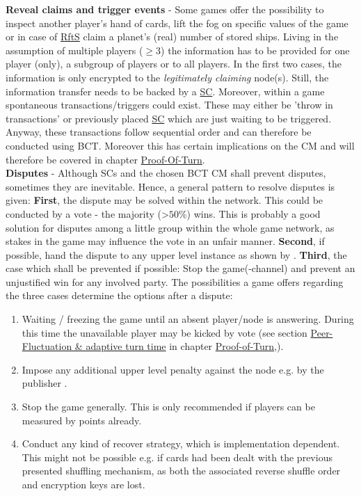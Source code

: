 \textbf{Reveal claims and trigger events} - Some games offer the possibility to inspect another player's hand of cards,
lift the fog on specific values of the game or in case of \hyperref[def:RftS]{RftS} claim a planet's (real) number of stored ships.
Living in the assumption of multiple players ($\geq3$) the information has to be provided for one player (only), a subgroup of players or to all players.
In the first two cases, the information is only encrypted to the \textit{legitimately claiming} node(s).
Still, the information transfer needs to be backed by a \hyperref[sec:SmartContract]{SC}.
Moreover, within a game spontaneous transactions/triggers could exist.
These may either be 'throw in transactions' or previously placed \hyperref[sec:SmartContract]{SC} which are just waiting to be triggered.
Anyway, these transactions follow sequential order and can therefore be conducted using \gls{BCT}.
Moreover this has certain implications on the \gls{CM} and will therefore be covered in chapter \hyperref[chap:PoT]{Proof-Of-Turn}. \\
\textbf{Disputes} - Although \gls{SC}s and the chosen \gls{BCT} \gls{CM} shall prevent disputes, sometimes they are inevitable.
Hence, a general pattern to resolve disputes is given:
\textbf{First}, the dispute may be solved within the network.
This could be conducted by a vote - the majority (>$50$\%) wins.
This is probably a good solution for disputes among a little group within the whole game network, as stakes in the game may influence the vote in an unfair manner.
\textbf{Second}, if possible, hand the dispute to any upper level instance as shown by \citet[92]{Kraft.2016}.
\textbf{Third}, the case which shall be prevented if possible: Stop the game(-channel) and prevent an unjustified win for any involved party.
The possibilities a game offers regarding the three cases determine the options after a dispute:
\begin{enumerate}
	\item Waiting / freezing the game until an absent player/node is answering.
	During this time the unavailable player may be kicked by vote
	(see section \hyperref[sec:PeerFluctuation]{Peer-Fluctuation \& adaptive turn time} in chapter \hyperref[chap:PoT]{Proof-of-Turn},).
	
	\item Impose any additional upper level penalty against the node e.g. by the publisher \cite[407]{Chatterjee.2019}.
	
	\item Stop the game generally.
	This is only recommended if players can be measured by points already.	
	
	\item Conduct any kind of recover strategy, which is implementation dependent.
	This might not be possible e.g. if cards had been dealt with the previous presented shuffling mechanism,
	as both the associated reverse shuffle order and encryption keys are lost.
\end{enumerate}



